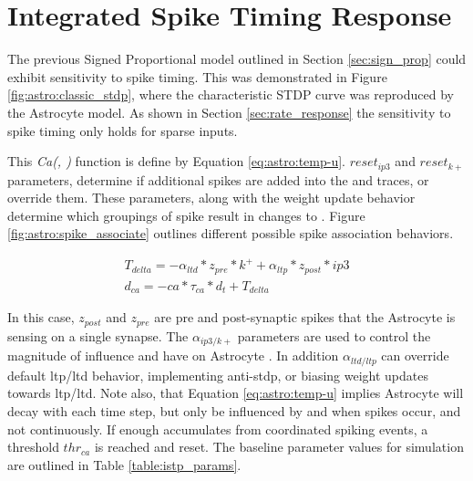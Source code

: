 \section{Integrated Spike Timing Response} \label{section:istp}
 The previous Signed Proportional model outlined in Section
\ref{sec:sign_prop} could exhibit sensitivity to spike timing. This was
demonstrated in Figure \ref{fig:astro:classic_stdp}, where the characteristic
STDP curve was reproduced by the Astrocyte model. As shown in Section
\ref{sec:rate_response} the sensitivity to spike timing only holds for sparse
inputs.

This \emph{Ca(\ipt, \kp)} function is define by Equation
\ref{eq:astro:temp-u}. $reset_{ip3}$ and $reset_{k+}$ parameters, determine if
additional spikes are added into the \ipt and \kp traces, or override
them. These parameters, along with the weight update behavior determine which
groupings of spike result in changes to \ca. Figure
\ref{fig:astro:spike_associate} outlines different possible spike association
behaviors.



\begin{align}
T_{delta} = -\alpha_{ltd} * z_{pre} * k^+ + \alpha_{ltp} * z_{post} * ip3 \\
d_{ca} = -ca * \tau_{ca} * d_t + T_{delta} \label{eq:astro:temp-u}
\end{align}

In this case, $z_{post}$ and $z_{pre}$ are pre and post-synaptic spikes that
the Astrocyte is sensing on a single synapse. The $\alpha_{ip3/k+}$ parameters
are used to control the magnitude of influence \ipt and \kp have on Astrocyte
\ca. In addition $\alpha_{ltd/ltp}$ can override default \Gls{ltp}/\Gls{ltd} behavior,
implementing anti-stdp, or biasing weight updates towards \Gls{ltp}/\Gls{ltd}. Note also,
that Equation \ref{eq:astro:temp-u} implies Astrocyte \ca will decay with each
time step, but only be influenced by \ipt and \kp when spikes occur, and
not continuously. If enough \ca accumulates from coordinated spiking events, a
threshold $thr_{ca}$ is reached and \ca reset. The baseline parameter values
for simulation are outlined in Table \ref{table:istp_params}.


